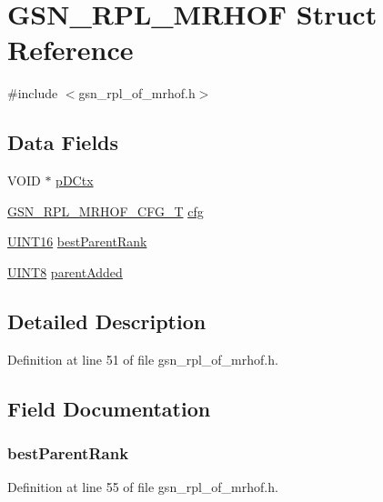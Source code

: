 \hypertarget{a00205}{
\section{GSN\_\-RPL\_\-MRHOF Struct Reference}
\label{a00205}
}


{\ttfamily \#include $<$gsn\_\-rpl\_\-of\_\-mrhof.h$>$}

\subsection*{Data Fields}
\begin{DoxyCompactItemize}
\item 
VOID $\ast$ \hyperlink{a00205_a3253e84cda227e6b191e0d46bf38ed3c}{pDCtx}
\item 
\hyperlink{a00206}{GSN\_\-RPL\_\-MRHOF\_\-CFG\_\-T} \hyperlink{a00205_ac5c3a52ba6b2f31c767761f1f942593b}{cfg}
\item 
\hyperlink{a00660_ga09f1a1fb2293e33483cc8d44aefb1eb1}{UINT16} \hyperlink{a00205_a3b2d9e58bdf55ff138b37b6c7d4cd8f5}{bestParentRank}
\item 
\hyperlink{a00660_gab27e9918b538ce9d8ca692479b375b6a}{UINT8} \hyperlink{a00205_a67f0be3ccd18b6a197bbd42a009fd79d}{parentAdded}
\end{DoxyCompactItemize}


\subsection{Detailed Description}


Definition at line 51 of file gsn\_\-rpl\_\-of\_\-mrhof.h.



\subsection{Field Documentation}
\hypertarget{a00205_a3b2d9e58bdf55ff138b37b6c7d4cd8f5}{
\subsubsection[{bestParentRank}]{ {\bf bestParentRank}}}
\label{a00205_a3b2d9e58bdf55ff138b37b6c7d4cd8f5}


Definition at line 55 of file gsn\_\-rpl\_\-of\_\-mrhof.h.

